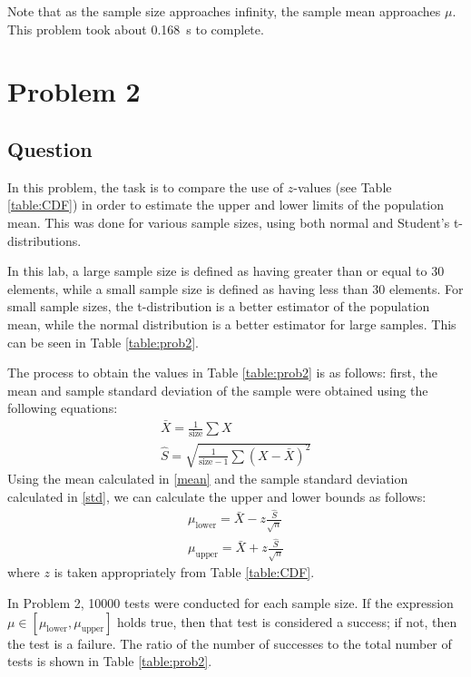\documentclass{article}
\begin{document}
Note that as the sample size approaches infinity, the sample mean
approaches \(\mu\). This problem took about \SI{0.168}{s}
to complete.

\section{Problem 2}
\subsection{Question} In this problem, the task is to compare
the use of \(z\)-values (see Table \ref{table:CDF}) in order
to estimate the upper and lower limits of the population mean.
This was done for various sample sizes, using
both normal and Student's t-distributions.

In this lab, a large sample size is defined as having greater
than or equal to 30 elements, while a small sample size is
defined as having less than 30 elements. For small sample
sizes, the t-distribution is a better estimator of the
population mean, while the normal distribution is a better
estimator for large samples. This can be seen in
Table \ref{table:prob2}.

The process to obtain the values in Table \ref{table:prob2}
is as follows: first, the mean and sample standard
deviation of the sample were obtained using the following
equations:
\begin{gather}
    \bar{X} = \frac1{\text{size}} \sum X \label{mean}\\
    \hat{S} = \sqrt{\frac1{\text{size} - 1} \sum (X - \bar{X})^2}
    \label{std}
\end{gather} Using the mean calculated in \eqref{mean} and the
sample standard deviation calculated in \eqref{std}, we can
calculate the upper and lower bounds as follows:
\begin{gather}
    \mu_\text{lower} = \bar{X} - z\frac{\hat{S}}{\sqrt{n}}
    \label{mu lower}\\
    \mu_\text{upper} = \bar{X} + z\frac{\hat{S}}{\sqrt{n}}
    \label{mu upper}
\end{gather} where \(z\) is taken appropriately from
Table \ref{table:CDF}.

In Problem 2, \num{10000} tests were conducted for each sample
size. If the expression
\(\mu \in [\mu_\text{lower}, \mu_\text{upper}]\)
holds true, then that test is considered a success; if not,
then the test is a failure. The ratio of the number of
successes to the total number of tests is shown in Table 
\ref{table:prob2}.
\end{document}

